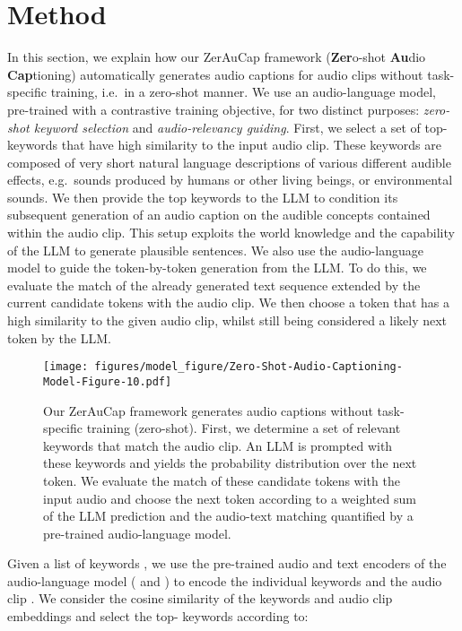 \documentclass{article}
\newcommand{\modelName}{ZerAuCap\xspace}
\newcommand{\mypara}[1]{\vspace{2pt}\noindent{\bf{#1}}}
\begin{document}
\section{Method}
In this section, we explain how our \modelName
framework (\textbf{Zer}o-shot \textbf{Au}dio \textbf{Cap}tioning) automatically generates audio captions for audio clips without task-specific training, i.e.\ in a zero-shot manner.
We use an audio-language model, pre-trained with a contrastive training objective, for two distinct purposes: \emph{zero-shot keyword selection} and \emph{audio-relevancy guiding}.
First, we select a set of top- keywords that have high similarity to the input audio clip.
These keywords are composed of very short natural language descriptions of various different audible effects, e.g.\ sounds produced by humans or other living beings, or environmental sounds.
We then provide the top keywords to the LLM to condition its subsequent generation of an audio caption on the audible concepts contained within the audio clip.
This setup exploits the world knowledge and the capability of the LLM to generate plausible sentences.
We also use the audio-language model to guide the token-by-token generation from the LLM\@. To do this, we evaluate the match of the already generated text sequence extended by the current candidate tokens with the audio clip. We then choose a token that has a high similarity to the given audio clip, whilst still being considered a likely next token by the LLM\@.

\begin{figure}[t]
    \vspace{-2ex}
    \centering
    \texttt{[image: figures/model\_figure/Zero-Shot-Audio-Captioning-Model-Figure-10.pdf]}
    \caption{Our \modelName framework generates audio captions without task-specific training (zero-shot). First, we determine a set of  relevant keywords that match the audio clip. An LLM is prompted with these keywords and yields the probability distribution over the next token. We evaluate the match of these candidate tokens with the input audio and choose the next token according to a weighted sum of the LLM prediction and the audio-text matching quantified by a pre-trained audio-language model.
    }\label{fig:model-figure}
    \vspace{-2ex}
\end{figure}

\mypara{Zero-shot keyword selection.}
Given a list of keywords , we use the pre-trained audio and text encoders of the audio-language model ( and ) to encode the individual keywords  and the audio clip . We consider the cosine similarity of the keywords and audio clip embeddings and select the top- keywords  according to:
\end{document}
